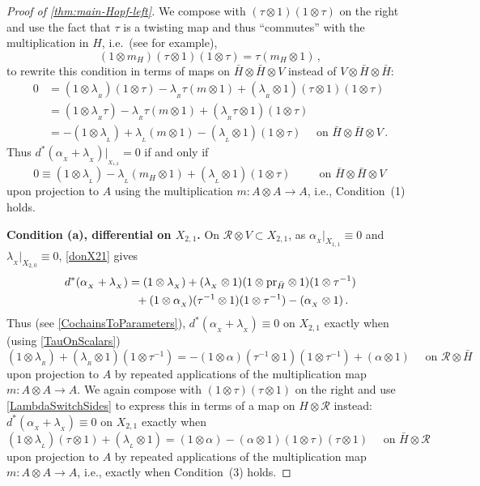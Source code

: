 \documentclass[11pt]{amsart}
\numberwithin{equation}{section}
\newcommand{\X}{_X}
\newcommand{\alphax}{\alpha_{\X}}
\newcommand{\lambdax}{\lambda_{\X}}
\newcommand{\pr}{ {\rm{pr}} }%
\newcommand{\R}{\mathcal{R}}
\newcommand{\itau}{{\tau^{-1}}}%
\renewcommand{\_}[1]{\mbox{$_{\left( #1 \right)}$}}
\newcommand{\ot}{\otimes}
\begin{document}
{\begin{proof}[Proof of \cref{thm:main-Hopf-left}]
We compose with $(\tau\ot 1)(1\ot \tau)$ on the right 
and use the fact that  $\tau$ 
is a twisting map
and thus ``commutes'' with the multiplication in $H$,
i.e.~(see \cite{TTP-AWEZ} for example), 
\begin{equation*}\label{twistingcondition}
(1\ot m_H)(\tau\ot 1)(1\ot \tau) = \tau(m_H\ot 1) 
\, ,
\end{equation*}
to rewrite this condition in terms of maps on $\bar H\ot \bar H\ot V$
instead of $V\ot \bar H\ot \bar H$:
%
$$
\begin{aligned}
0&=(1\ot \lambda_{_R})(1\ot \tau) 
-\lambda_{_R}\tau(m\ot 1) 
+(\lambda_{_R}\ot 1) (\tau\ot 1)(1\ot \tau)
\\ &=(1\ot \lambda_{_R}\tau ) 
-\lambda_{_R}\tau(m\ot 1) 
+(\lambda_{_R}\tau\ot 1) (1\ot \tau)
\\ &=-(1\ot \lambda_{_L}) 
+\lambda_{_L}(m\ot 1) 
-(\lambda_{_L}\ot 1) (1\ot \tau)
\quad\text{ on }  \bar H\ot \bar H\ot V
\, .
\end{aligned}
$$
%
Thus $d^*(\alphax + \lambdax) |_{_{X_{1,2}}} = 0$ 
if and only if 
$$0\equiv (1\ot \lambda_{_L}) 
-\lambda_{_L}(m_H\ot 1) +(\lambda_{_L}\ot 1)(1 \ot \tau)  
\, 
\qquad\text{ on } \bar H\ot \bar H\ot V 
\, 
$$
upon projection to $A$ using the multiplication $m:A\ot 
A\rightarrow A$, i.e., Condition~(1) holds. 

{\bf Condition (a), differential on $X_{2,1}$.}
On $\R\ot V\subset X_{2,1}$, as $\alphax|_{X_{1,1}}\equiv 0$ and $\lambdax|_{X_{2,0}}\equiv
0$,
\cref{donX21} gives
  $$
\begin{aligned}
  d^*(\alphax +\lambdax) 
  & =
   (1\ot \lambdax) 
   +(\lambdax \ot 1) (1\ot \pr_{\bar H}\ot 1)
   (1\ot \itau)
   \\ & \ \ 
 +(1\ot \alphax) (\itau\ot 1)(1\ot \itau) 
 -(\alphax\ot 1)
 \, .
 \end{aligned}
 $$
 Thus (see \cref{CochainsToParameters}),
 $d^*(\alphax +\lambdax) \equiv 0$  
on $X_{2,1}$ exactly when (using \cref{TauOnScalars})
$$
 (1\ot \lambda_{_R}) 
 +(\lambda_{_R} \ot 1)(1\ot \itau) 
 =-(1\ot\alpha) (\itau\ot 1)(1\ot \itau) 
 +(\alpha\ot 1)
 \quad\text{ on $\R\ot \bar H$}
 $$
upon projection to $A$ by repeated applications
 of the multiplication map $m:A\ot A\rightarrow A$.
We again compose with $(1\ot \tau)(\tau\ot 1)$
on the right and use \cref{LambdaSwitchSides}
to express this in terms of a map 
 on $H\ot \R$ instead:
$d^*(\alphax +\lambdax) \equiv 0$  
on $X_{2,1}$ exactly when
 $$
 (1\ot \lambda_{_L})(\tau\ot 1) 
+ (\lambda_{_L} \ot 1)
 =(1\ot\alpha) 
 -(\alpha\ot 1) (1\ot \tau)(\tau\ot 1)
 \quad\text{ on } \bar H\ot \R $$
 upon projection to $A$ by repeated applications of the
 multiplication map
 $m:A\ot A\rightarrow A$, i.e.,
exactly when
Condition~(3) holds.


\end{proof}}
\end{document}
